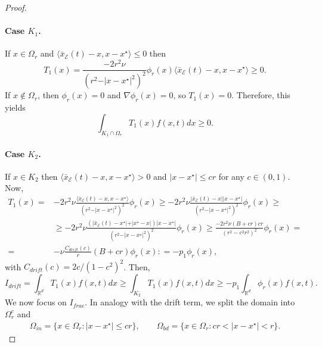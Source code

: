 \documentclass[10pt,a4paper]{amsart}
\def\RR{\mathbb R}
\begin{document}
\begin{proof}
	\paragraph{Case $K_1$.} 
	If $x\in \Omega_r$ and $\langle \bar{x}_\mathcal{E}(t)-x, x-x^\star\rangle\leq 0$ then 
	\begin{equation*}
		T_1(x) = \frac{-2 r^2 \nu}{(r^2 - \vert x-x^\star \vert^2)^2} \phi_r(x) \langle \bar{x}_\mathcal{E}(t)-x, x-x^\star\rangle \geq 0.
	\end{equation*}
	If $x \not \in \Omega_r$, then $\phi_r(x) = 0$ and $\nabla \phi_r(x)=0$, so $T_1(x)=0$. 
	Therefore, this yields
	\begin{equation*}
		\int_{K_1\cap \Omega_r} T_1(x) f(x,t) dx \geq 0. 
	\end{equation*}
	\paragraph{Case $K_2$.} If $x\in K_2$ then $\langle \bar{x}_\mathcal{E}(t)-x, x-x^\star\rangle> 0$ and $\vert x-x^\star \vert \leq cr$ for any $c\in (0,1)$.
	Now,
	\begin{equation*}
		\begin{split}
			T_1(x) = & -2 r^2 \nu \frac{\langle \bar{x}_\mathcal{E}(t)-x, x-x^\star\rangle}{(r^2-\vert x-x^\star\vert ^2)^2}\phi_r(x) \geq -2 r^2 \nu \frac{\vert \bar{x}_\mathcal{E}(t)-x\vert \vert x-x^\star\vert}{(r^2-\vert x-x^\star\vert ^2)^2} \phi_r(x) \geq \\ 
			& \geq -2 r^2 \nu \frac{\left( \vert \bar{x}_\mathcal{E}(t)-x^\star\vert + \vert x^\star - x \vert \right) \vert x-x^\star\vert}{(r^2-\vert x-x^\star\vert ^2)^2} \phi_r(x) \geq \frac{-2r^2\nu (B+cr) cr}{(r^2-c^2r^2)^2}\phi_r(x) = \\
			= & -\nu \frac{C_{drift}(c)}{r} (B+cr) \phi_r(x) : = -p_1 \phi_r(x),
		\end{split}
	\end{equation*}
	with $C_{drift}(c) = 2c/(1-c^2)^2$. Then, 
	\begin{equation}\label{eq:I_drift}
		I_{drift} = \int_{\RR^d} T_1(x) f(x,t) dx \geq \int_{K_2} T_1(x) f(x,t)dx \geq -p_1 \int_{\RR^d} \phi_r(x) f(x,t).
	\end{equation}
	We now focus on $I_{frac}$. 
	In analogy with the drift term, we split the domain into $\Omega_r^c$ and 
	\begin{align*}
		\Omega_{in} = \{x \in \Omega_r : \vert x-x^\star \vert \leq cr\}, \qquad
		\Omega_{bd} = \{x \in \Omega_r : cr< \vert x-x^\star \vert <r\}. 
	\end{align*}

\end{proof}
\end{document}
